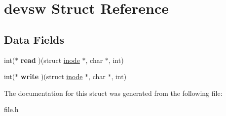 \hypertarget{structdevsw}{}\section{devsw Struct Reference}
\label{structdevsw}
\subsection*{Data Fields}
\begin{DoxyCompactItemize}
\item 
int($\ast$ {\bfseries read} )(struct \hyperlink{structinode}{inode} $\ast$, char $\ast$, int)\hypertarget{structdevsw_a4efbe00d0031a1c9005ef2186947ea37}{}\label{structdevsw_a4efbe00d0031a1c9005ef2186947ea37}

\item 
int($\ast$ {\bfseries write} )(struct \hyperlink{structinode}{inode} $\ast$, char $\ast$, int)\hypertarget{structdevsw_a87fd7af6c9a6fb8663fc206be7a233d4}{}\label{structdevsw_a87fd7af6c9a6fb8663fc206be7a233d4}

\end{DoxyCompactItemize}


The documentation for this struct was generated from the following file\+:\begin{DoxyCompactItemize}
\item 
file.\+h\end{DoxyCompactItemize}
